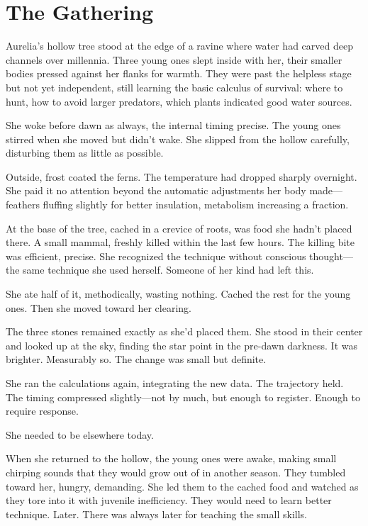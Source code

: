 \chapter{The Gathering}
\label{ch:03}


Aurelia's hollow tree stood at the edge of a ravine where water had carved deep channels over millennia. Three young ones slept inside with her, their smaller bodies pressed against her flanks for warmth. They were past the helpless stage but not yet independent, still learning the basic calculus of survival: where to hunt, how to avoid larger predators, which plants indicated good water sources.

She woke before dawn as always, the internal timing precise. The young ones stirred when she moved but didn't wake. She slipped from the hollow carefully, disturbing them as little as possible.

Outside, frost coated the ferns. The temperature had dropped sharply overnight. She paid it no attention beyond the automatic adjustments her body made—feathers fluffing slightly for better insulation, metabolism increasing a fraction.

At the base of the tree, cached in a crevice of roots, was food she hadn't placed there. A small mammal, freshly killed within the last few hours. The killing bite was efficient, precise. She recognized the technique without conscious thought—the same technique she used herself. Someone of her kind had left this.

She ate half of it, methodically, wasting nothing. Cached the rest for the young ones. Then she moved toward her clearing.

The three stones remained exactly as she'd placed them. She stood in their center and looked up at the sky, finding the star point in the pre-dawn darkness. It was brighter. Measurably so. The change was small but definite.

She ran the calculations again, integrating the new data. The trajectory held. The timing compressed slightly—not by much, but enough to register. Enough to require response.

She needed to be elsewhere today.

When she returned to the hollow, the young ones were awake, making small chirping sounds that they would grow out of in another season. They tumbled toward her, hungry, demanding. She led them to the cached food and watched as they tore into it with juvenile inefficiency. They would need to learn better technique. Later. There was always later for teaching the small skills.

